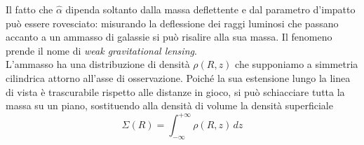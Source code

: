 Il fatto che $\hat\alpha$ dipenda soltanto dalla massa deflettente e dal parametro d'impatto può essere rovesciato: misurando la deflessione dei raggi luminosi che passano accanto a un ammasso di galassie si può risalire alla sua massa. Il fenomeno prende il nome di \emph{weak gravitational lensing}.\\

L'ammasso ha una distribuzione di densità $\rho(R,z)$ che supponiamo a simmetria cilindrica attorno all'asse di osservazione. Poiché la sua estensione lungo la linea di vista è trascurabile rispetto alle distanze in gioco, si può schiacciare tutta la massa su un piano, sostituendo alla densità di volume la densità superficiale
%
\begin{equation}
    \Sigma(R) = \int_{-\infty}^{+\infty} \rho(R,z) \, dz
    \label{eq:densita_superficiale}
\end{equation}

